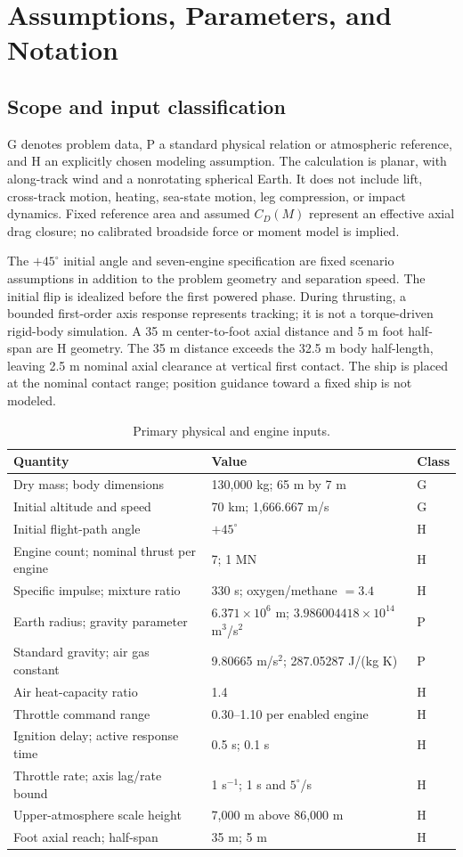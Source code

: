 \documentclass[11pt,a4paper]{article}
\begin{document}
\section{Assumptions, Parameters, and Notation}
\subsection{Scope and input classification}
G denotes problem data, P a standard physical relation or atmospheric reference, and H an explicitly chosen modeling assumption. The calculation is planar, with along-track wind and a nonrotating spherical Earth. It does not include lift, cross-track motion, heating, sea-state motion, leg compression, or impact dynamics. Fixed reference area and assumed $C_D(M)$ represent an effective axial drag closure; no calibrated broadside force or moment model is implied.

The $+45^\circ$ initial angle and seven-engine specification are fixed scenario assumptions in addition to the problem geometry and separation speed. The initial flip is idealized before the first powered phase. During thrusting, a bounded first-order axis response represents tracking; it is not a torque-driven rigid-body simulation. A 35 m center-to-foot axial distance and 5 m foot half-span are H geometry. The 35 m distance exceeds the 32.5 m body half-length, leaving 2.5 m nominal axial clearance at vertical first contact. The ship is placed at the nominal contact range; position guidance toward a fixed ship is not modeled.
\begin{table}[htbp]\centering\small\caption{Primary physical and engine inputs.}\label{tab:inputs}
\begin{tabularx}{\linewidth}{@{}lXl@{}}\toprule Quantity & Value & Class\\\midrule
Dry mass; body dimensions & 130,000 kg; 65 m by 7 m & G\\
Initial altitude and speed & 70 km; 1,666.667 m/s & G\\
Initial flight-path angle & $+45^\circ$ & H\\
Engine count; nominal thrust per engine & 7; 1 MN & H\\
Specific impulse; mixture ratio & 330 s; oxygen/methane $=3.4$ & H\\
Earth radius; gravity parameter & $6.371\times10^6$ m; $3.986004418\times10^{14}$ m$^3$/s$^2$ & P\\
Standard gravity; air gas constant & 9.80665 m/s$^2$; 287.05287 J/(kg K) & P\\
Air heat-capacity ratio & 1.4 & H\\
Throttle command range & 0.30--1.10 per enabled engine & H\\
Ignition delay; active response time & 0.5 s; 0.1 s & H\\
Throttle rate; axis lag/rate bound & 1 s$^{-1}$; 1 s and $5^\circ$/s & H\\
Upper-atmosphere scale height & 7,000 m above 86,000 m & H\\
Foot axial reach; half-span & 35 m; 5 m & H\\
\bottomrule\end{tabularx}\end{table}
\end{document}
